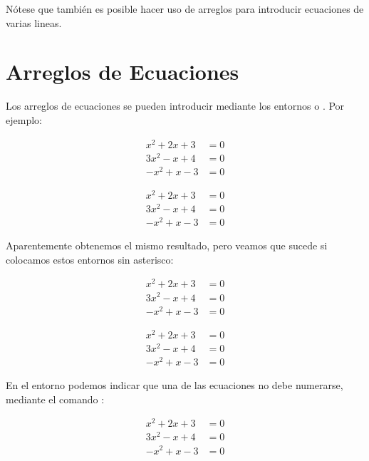\documentclass[letterpaper,12pt]{book}
\begin{document}
Nótese que también es posible hacer uso de arreglos para introducir ecuaciones de varias lineas.

\newpage

\section{Arreglos de Ecuaciones}

Los arreglos de ecuaciones se pueden introducir mediante los entornos \verb@aligned@ o \verb@align@. Por ejemplo:

\begin{equation*}
\begin{aligned}
	x^2 + 2x + 3 &= 0 \\
	3x^2 - x + 4 &= 0 \\
	-x^2 + x - 3 &= 0
\end{aligned}
\end{equation*}

\begin{align*}
	x^2 + 2x + 3 &= 0 \\
	3x^2 - x + 4 &= 0 \\
	-x^2 + x - 3 &= 0
\end{align*}

Aparentemente obtenemos el mismo resultado, pero veamos que sucede si colocamos estos entornos sin asterisco:

\begin{equation} \label{sist:eq1}
\begin{aligned}
	x^2 + 2x + 3 &= 0 \\
	3x^2 - x + 4 &= 0 \\
	-x^2 + x - 3 &= 0
\end{aligned}
\end{equation}

\begin{align}
	x^2 + 2x + 3 &= 0 \\
	3x^2 - x + 4 &= 0 \\
	-x^2 + x - 3 &= 0
\end{align}

En el entorno \verb@align@ podemos indicar que una de las ecuaciones no debe numerarse, mediante el comando \verb@\nonumber@:

\begin{align}
	x^2 + 2x + 3 &= 0 \\
	3x^2 - x + 4 &= 0 \nonumber \\
	-x^2 + x - 3 &= 0
\end{align}
\end{document}

